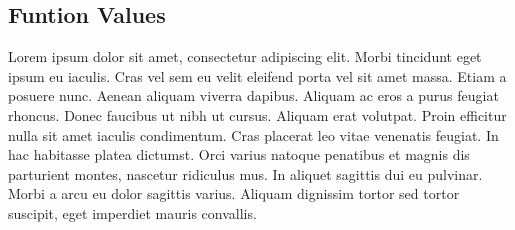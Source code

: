 \subsection{Funtion Values}
Lorem ipsum dolor sit amet, consectetur adipiscing elit. Morbi tincidunt eget 
ipsum eu iaculis. Cras vel sem eu velit eleifend porta vel sit amet massa. Etiam 
a posuere nunc. Aenean aliquam viverra dapibus. Aliquam ac eros a purus feugiat 
rhoncus. Donec faucibus ut nibh ut cursus. Aliquam erat volutpat. Proin efficitur 
nulla sit amet iaculis condimentum. Cras placerat leo vitae venenatis feugiat. In 
hac habitasse platea dictumst. Orci varius natoque penatibus et magnis dis 
parturient montes, nascetur ridiculus mus. In aliquet sagittis dui eu pulvinar. 
Morbi a arcu eu dolor sagittis varius. Aliquam dignissim tortor sed tortor 
suscipit, eget imperdiet mauris convallis.~\cite[p.~00]{todoCitation}\todoCitation
%
